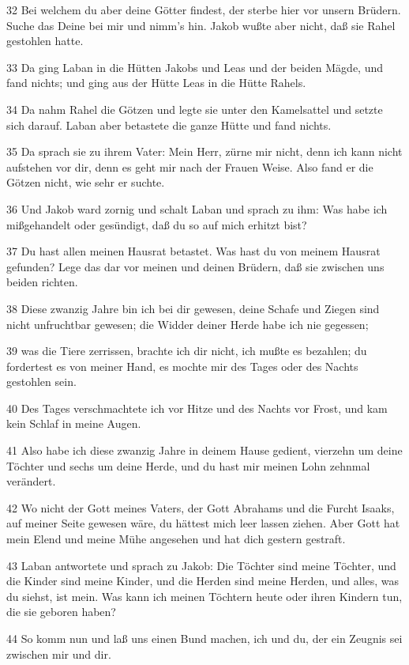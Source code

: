 \par 32 Bei welchem du aber deine Götter findest, der sterbe hier vor unsern Brüdern. Suche das Deine bei mir und nimm's hin. Jakob wußte aber nicht, daß sie Rahel gestohlen hatte.
\par 33 Da ging Laban in die Hütten Jakobs und Leas und der beiden Mägde, und fand nichts; und ging aus der Hütte Leas in die Hütte Rahels.
\par 34 Da nahm Rahel die Götzen und legte sie unter den Kamelsattel und setzte sich darauf. Laban aber betastete die ganze Hütte und fand nichts.
\par 35 Da sprach sie zu ihrem Vater: Mein Herr, zürne mir nicht, denn ich kann nicht aufstehen vor dir, denn es geht mir nach der Frauen Weise. Also fand er die Götzen nicht, wie sehr er suchte.
\par 36 Und Jakob ward zornig und schalt Laban und sprach zu ihm: Was habe ich mißgehandelt oder gesündigt, daß du so auf mich erhitzt bist?
\par 37 Du hast allen meinen Hausrat betastet. Was hast du von meinem Hausrat gefunden? Lege das dar vor meinen und deinen Brüdern, daß sie zwischen uns beiden richten.
\par 38 Diese zwanzig Jahre bin ich bei dir gewesen, deine Schafe und Ziegen sind nicht unfruchtbar gewesen; die Widder deiner Herde habe ich nie gegessen;
\par 39 was die Tiere zerrissen, brachte ich dir nicht, ich mußte es bezahlen; du fordertest es von meiner Hand, es mochte mir des Tages oder des Nachts gestohlen sein.
\par 40 Des Tages verschmachtete ich vor Hitze und des Nachts vor Frost, und kam kein Schlaf in meine Augen.
\par 41 Also habe ich diese zwanzig Jahre in deinem Hause gedient, vierzehn um deine Töchter und sechs um deine Herde, und du hast mir meinen Lohn zehnmal verändert.
\par 42 Wo nicht der Gott meines Vaters, der Gott Abrahams und die Furcht Isaaks, auf meiner Seite gewesen wäre, du hättest mich leer lassen ziehen. Aber Gott hat mein Elend und meine Mühe angesehen und hat dich gestern gestraft.
\par 43 Laban antwortete und sprach zu Jakob: Die Töchter sind meine Töchter, und die Kinder sind meine Kinder, und die Herden sind meine Herden, und alles, was du siehst, ist mein. Was kann ich meinen Töchtern heute oder ihren Kindern tun, die sie geboren haben?
\par 44 So komm nun und laß uns einen Bund machen, ich und du, der ein Zeugnis sei zwischen mir und dir.
